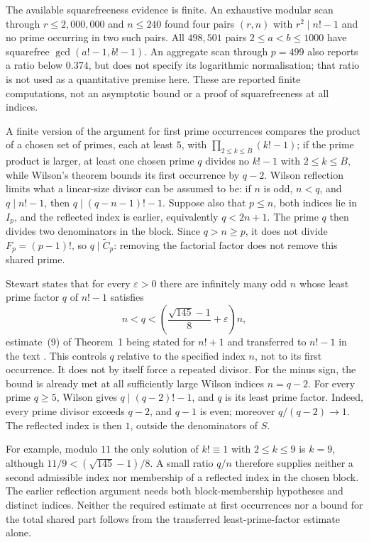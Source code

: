 The available squarefreeness evidence is finite. An exhaustive modular scan through
$r\le2{,}000{,}000$ and $n\le240$ found four pairs $(r,n)$ with $r^2\mid n!-1$ and no
prime occurring in two such pairs.  All $498{,}501$ pairs $2\le a<b\le1000$ have
squarefree $\gcd(a!-1,b!-1)$. An aggregate scan through $p=499$ also reports a ratio below
$0.374$, but does not specify its logarithmic normalisation; that ratio is
not used as a quantitative premise here. These are reported finite
computations, not an asymptotic bound or a proof of squarefreeness at all
indices.

A finite version of the argument for first prime occurrences compares the product of a
chosen set of primes, each at least $5$, with $\prod_{2\le k\le B}(k!-1)$; if
the prime product is larger, at least one chosen prime $q$ divides no $k!-1$ with $2\le k\le B$,
while Wilson's theorem bounds its first occurrence by $q-2$.  Wilson reflection
limits what a linear-size divisor can be assumed to be: if $n$ is odd,
$n<q$, and $q\mid n!-1$, then $q\mid(q-n-1)!-1$. Suppose also that
$p\le n$, both indices lie in $I_p$, and the reflected index is earlier,
equivalently $q<2n+1$. The prime $q$ then divides two denominators in the
block. Since $q>n\ge p$, it does not divide $F_p=(p-1)!$, so
$q\mid\widetilde C_p$: removing the factorial factor does not remove this
shared prime.

Stewart states that for every $\varepsilon>0$ there are infinitely many odd
$n$ whose least prime factor $q$ of $n!-1$ satisfies
\[
 n<q<\left(\frac{\sqrt{145}-1}{8}+\varepsilon\right)n ,
\]
estimate~(9) of Theorem~1 being stated for $n!+1$ \cite[p.~463]{stewart2004}
and transferred to $n!-1$ in the text \cite[p.~464]{stewart2004}.  This controls $q$ relative to the specified index $n$, not to its first
occurrence. It does not by itself force a repeated divisor. For the minus
sign, the bound is already met at all sufficiently large Wilson indices
$n=q-2$. For every prime $q\ge5$, Wilson gives $q\mid(q-2)!-1$, and $q$ is its least prime
factor. Indeed, every prime divisor exceeds $q-2$, and $q-1$ is even;
moreover $q/(q-2)\to1$. The reflected index is then $1$, outside the denominators of $S$.

For example, modulo $11$ the only solution of $k!\equiv1$ with
$2\le k\le9$ is $k=9$, although $11/9<(\sqrt{145}-1)/8$.
A small ratio $q/n$ therefore supplies neither a second admissible index nor
membership of a reflected index in the chosen block. The earlier
reflection argument needs both block-membership hypotheses and distinct
indices. Neither the required estimate at first occurrences nor a bound
for the total shared part follows from the transferred least-prime-factor
estimate alone.

